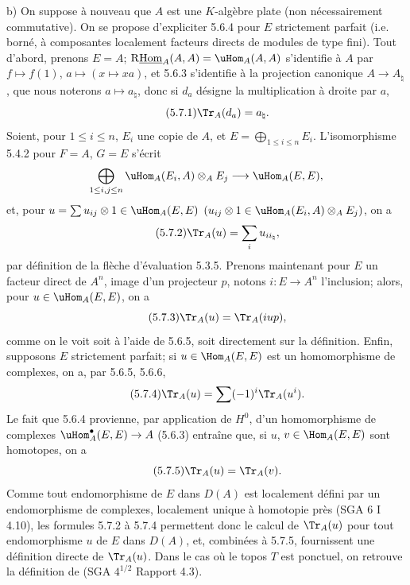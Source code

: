 b) On suppose à nouveau que $A$ est une $K$-algèbre plate (non nécessairement commutative). On se propose d'expliciter 5.6.4 pour $E$ strictement parfait (i.e. borné, à composantes localement facteurs directs de modules  de type fini). Tout d'abord, prenons $E=A$; $\mathrm{R}\underline{\mathrm{Hom}}_A(A,A)=\uHom_A(A,A)$ s'identifie à $A$ par $f\mapsto f(1)$, $a\mapsto(x\mapsto xa)$, et 5.6.3 s'identifie à la projection canonique $A\to A_\natural$, que nous noterons $a\mapsto a_\natural$, donc si $d_a$ désigne la multiplication à droite par $a$,
\begin{equation}\tag{5.7.1}
\Tr_A(d_a)=a_\natural.
\end{equation}
Soient, pour $1\le i\le n$, $E_i$ une copie de $A$, et $E=\bigoplus_{1\le i\le n}E_i$. L'isomorphisme 5.4.2 pour $F=A$, $G=E$ s'écrit
\[
\bigoplus_{1\le i,j\le n}\uHom_A(E_i,A)\otimes_AE_j\longrightarrow\uHom_A(E,E),
\]
et, pour $u=\sum u_{ij}\otimes 1\in\uHom_A(E,E)$ $(u_{ij}\otimes 1\in\uHom_A(E_i,A)\otimes_A E_j)$, on a
\begin{equation}\tag{5.7.2}
\Tr_A(u)=\sum_i u_{ii_\natural},
\end{equation}
par définition de la flèche d'évaluation 5.3.5. Prenons maintenant pour $E$ un facteur direct de $A^n$, image d'un projecteur $p$, notons $i:E\to A^n$ l'inclusion; alors, pour $u\in\uHom_A(E,E)$, on a
\begin{equation}\tag{5.7.3}
\Tr_A(u)=\Tr_A(iup),
\end{equation}
comme on le voit soit à l'aide de 5.6.5, soit directement sur la définition. Enfin, supposons $E$ strictement parfait; si $u\in\Hom_A(E,E)$ est un homomorphisme de complexes, on a, par 5.6.5, 5.6.6,
\begin{equation}\tag{5.7.4}
\Tr_A(u)=\sum(-1)^i\Tr_A(u^i).
\end{equation}
Le
fait que 5.6.4 provienne, par application de $H^0$, d'un homomorphisme de complexes $\uHom_A^\bullet(E,E)\to A$ (5.6.3) entraîne que, si $u$, $v\in\Hom_A(E,E)$ sont homotopes, on a
\begin{equation}\tag{5.7.5}
\Tr_A(u)=\Tr_A(v).
\end{equation}
Comme tout endomorphisme de $E$ dans $D(A)$ est localement défini par un endomorphisme de complexes, localement unique à homotopie près (SGA 6 I 4.10), les formules 5.7.2 à 5.7.4 permettent donc le calcul de $\Tr_A(u)$ pour tout endomorphisme $u$ de $E$ dans $D(A)$, et, combinées à 5.7.5, fournissent une définition directe de $\Tr_A(u)$. Dans le cas où le topos $T$ est ponctuel, on retrouve la définition de (SGA $4^{1/2}$ Rapport 4.3).

